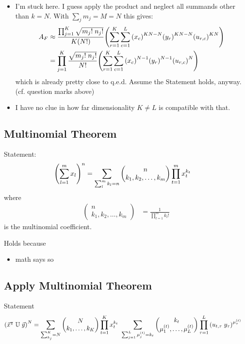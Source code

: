 \documentclass[
	english,
	a4paper,
	fontsize=10pt,
	parskip=half,
	titlepage=true,
	DIV=12,
	final
]{scrreprt}
\newcommand*{\transp}{\ensuremath{^\intercal}}
\begin{document}
\begin{itemize}
\item {\color{red} I'm stuck here. I guess apply the product and neglect all summands other than $k=N$.
	With $\sum_j m_j = M = N$ this gives:}
\begin{align}
	A_F
&\approx
	\frac
		{\prod_{j=1}^{K} \sqrt{m_j! \; n_j!}}
		{K(N!)}
	\qty( 
		\sum_{r=1}^{K}
		\sum_{c=1}^{L}
			\qty(x_c)^{KN - N}
			\qty(y_r)^{KN - N}
			\qty(u_{r,c})^{KN}
	) \\
&=
	\prod_{j=1}^{K}
		\frac
			{\sqrt{m_j! \; n_j!}}
			{N!}
		\qty(
			\sum_{r=1}^{K}
			\sum_{c=1}^{L}
				\qty(x_c)^{N-1}
				\qty(y_r)^{N-1}
				\qty(u_{r,c})^{N}
		)
\end{align}
	{\color{red} which is already pretty close to q.e.d. Assume the Statement holds, anyway. 
	(cf. question marks above)}
\item {\color{red} I have no clue in how far dimensionality $K \neq L$ is compatible with that.}
\end{itemize}

\subsection{Multinomial Theorem}
Statement:
\begin{align}
	\qty(
		\sum_{l=1}^{m} x_l
	)^{n}
&=
	\sum_{\sum_l^m k_l = n}
	\begin{pmatrix}
		n \\ k_1, k_2, \ldots, k_m
	\end{pmatrix}
	\prod_{t=1}^{m}
		x_t^{k_t}
\end{align}
where
\begin{align}
	\begin{pmatrix}
		n \\ k_1, k_2, \ldots, k_m
	\end{pmatrix}
&=
	\frac{1}
	{\prod_{l=1}^m k_l !}
\end{align}
is the multinomial coefficient.

Holds because
\begin{itemize}
\item math says so
\end{itemize}

\subsection{Apply Multinomial Theorem}
Statement
\begin{align}
	\qty( \vec{x}\transp \; \mathbb{U} \; \vec{y} )^{N}
&=
	\sum_{\sum_{k_j}^K = N}
		\begin{pmatrix}
			N \\ k_1, \ldots, k_K
		\end{pmatrix}
		\prod_{t=1}^K
			x_t^{k_t} ~
			\sum_{\sum_{j=1}^{L} \mu_j^{(t)} = k_t}
				\begin{pmatrix}
					k_t \\ \mu_1^{(t)}, \ldots, \mu_L^{(t)}
				\end{pmatrix}
				\prod_{\tau=1}^{L}
					\qty(
						u_{t, \tau} \; y_\tau
					)^{\mu_\tau^{(t)}}
\end{align}
\end{document}
